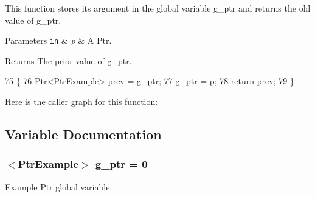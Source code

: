 This function stores it\textquotesingle{}s argument in the global variable {\ttfamily g\+\_\+ptr} and returns the old value of {\ttfamily g\+\_\+ptr}. 
\begin{DoxyParams}[1]{Parameters}
\mbox{\tt in}  & {\em p} & A Ptr. \\
\hline
\end{DoxyParams}
\begin{DoxyReturn}{Returns}
The prior value of {\ttfamily g\+\_\+ptr}. 
\end{DoxyReturn}

\begin{DoxyCode}
75 \{
76   \hyperlink{classns3_1_1Ptr}{Ptr<PtrExample>} prev = \hyperlink{main-ptr_8cc_a7f246f352a3f9f2e28ba7d122c0788b8}{g\_ptr};
77   \hyperlink{main-ptr_8cc_a7f246f352a3f9f2e28ba7d122c0788b8}{g\_ptr} = \hyperlink{lte__link__budget_8m_ac9de518908a968428863f829398a4e62}{p};
78   \textcolor{keywordflow}{return} prev;
79 \}
\end{DoxyCode}


Here is the caller graph for this function\+:




\subsection{Variable Documentation}
\subsubsection[{\texorpdfstring{g\+\_\+ptr}{g_ptr}}]{$<${\bf Ptr\+Example}$>$ g\+\_\+ptr = 0\hspace{0.3cm}{\ttfamily [static]}}\hypertarget{main-ptr_8cc_a7f246f352a3f9f2e28ba7d122c0788b8}{}\label{main-ptr_8cc_a7f246f352a3f9f2e28ba7d122c0788b8}
Example Ptr global variable. 
